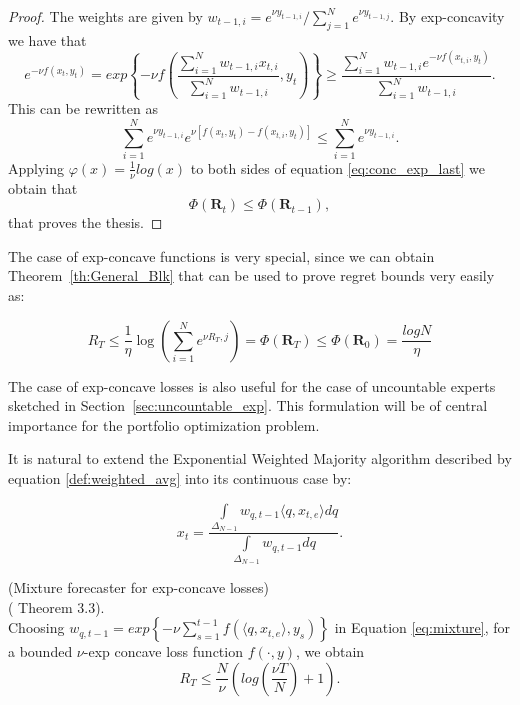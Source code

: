 \begin{proof}
    The weights are given by $w_{t-1,i}=e^{\nu y_{t-1,i}}/\sum\limits_{j=1}^N e^{\nu y_{t-1,j}}$.
    By exp-concavity we have that
    \begin{equation}
        e^{-\nu f(x_t,y_t)}=exp\left\{-\nu f \left(\frac{\sum\limits_{i=1}^N w_{t-1,i}x_{t,i}}{\sum\limits_{i=1}^N w_{t-1,i}},y_t\right)\right\}\ge \frac{\sum\limits_{i=1}^N w_{t-1,i}e^{-\nu f(x_{t,i},y_t)}}{\sum\limits_{i=1}^N w_{t-1,i}}.
    \end{equation}
    This can be rewritten as 
    \begin{equation}\label{eq:conc_exp_last}
        \sum\limits_{i=1}^N e^{\nu y_{t-1,i}}e^{\nu [f(x_t,y_t)-f(x_{t,i},y_t)]}\le \sum\limits_{i=1}^N e^{\nu y_{t-1,i}}.
    \end{equation}
    Applying $\varphi(x)=\frac{1}{\nu}log(x)$ to both sides of equation \eqref{eq:conc_exp_last} we obtain that $$\Phi(\mathbf R_{t})\le \Phi(\mathbf R_{t-1}),$$ that proves the thesis.
\end{proof}

The case of exp-concave functions is very special, since we can obtain Theorem~\ref{th:General_Blk} that can be used to prove regret bounds very easily as:

\begin{equation}\label{eq:regret_exp_finite}
    R_T\le \frac{1}{\eta}\log\left(\sum\limits_{i=1}^N e^{\nu R_T,j}\right)=\Phi(\mathbf R_T)\le\Phi(\mathbf R_0) = \frac{log N}{\eta}
\end{equation}

The case of exp-concave losses is also useful for the case of uncountable experts sketched in Section~\ref{sec:uncountable_exp}. This formulation will be of central importance for the portfolio optimization problem.

It is natural to extend the Exponential Weighted Majority algorithm described by equation \eqref{def:weighted_avg} into its continuous case by:

\begin{equation}\label{eq:mixture}
    x_t=\frac{\int\limits_{\Delta_{N-1}} w_{q,t-1}\langle q,x_{t,e}\rangle dq}{\int\limits_{\Delta_{N-1}} w_{q,t-1}dq}.
\end{equation}

\begin{theorem}(Mixture forecaster for exp-concave losses)\\
(\cite{cesa2006prediction} Theorem 3.3).\label{th:mixture_forecaster}\\
    Choosing $w_{q,t-1}=exp\left\{-\nu\sum\limits_{s=1}^{t-1}f(\langle q,x_{t,e}\rangle,y_s)\right\}$ in Equation \eqref{eq:mixture}, for a bounded $\nu$-exp concave loss function $f(\cdot,y)$, we obtain
    $$R_T\le \frac{N}{\nu}\left(log\left(\frac{\nu T}{N}\right)+1\right).$$
\end{theorem}


